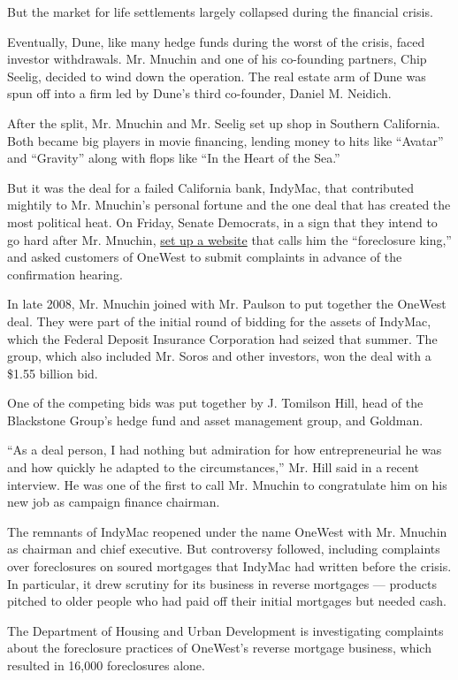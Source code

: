 But the market for life settlements largely collapsed during the
financial crisis.

Eventually, Dune, like many hedge funds during the worst of the crisis,
faced investor withdrawals. Mr. Mnuchin and one of his co-founding
partners, Chip Seelig, decided to wind down the operation. The real
estate arm of Dune was spun off into a firm led by Dune's third
co-founder, Daniel M. Neidich.

After the split, Mr. Mnuchin and Mr. Seelig set up shop in Southern
California. Both became big players in movie financing, lending money to
hits like ``Avatar'' and ``Gravity'' along with flops like ``In the
Heart of the Sea.''

But it was the deal for a failed California bank, IndyMac, that
contributed mightily to Mr. Mnuchin's personal fortune and the one deal
that has created the most political heat. On Friday, Senate Democrats,
in a sign that they intend to go hard after Mr. Mnuchin,
\href{https://democrats.senate.gov/foreclosureking/\#.WFfkiVMrLIX}{set
up a website} that calls him the ``foreclosure king,'' and asked
customers of OneWest to submit complaints in advance of the confirmation
hearing.

In late 2008, Mr. Mnuchin joined with Mr. Paulson to put together the
OneWest deal. They were part of the initial round of bidding for the
assets of IndyMac, which the Federal Deposit Insurance Corporation had
seized that summer. The group, which also included Mr. Soros and other
investors, won the deal with a \$1.55 billion bid.

One of the competing bids was put together by J. Tomilson Hill, head of
the Blackstone Group's hedge fund and asset management group, and
Goldman.

``As a deal person, I had nothing but admiration for how entrepreneurial
he was and how quickly he adapted to the circumstances,'' Mr. Hill said
in a recent interview. He was one of the first to call Mr. Mnuchin to
congratulate him on his new job as campaign finance chairman.

The remnants of IndyMac reopened under the name OneWest with Mr. Mnuchin
as chairman and chief executive. But controversy followed, including
complaints over foreclosures on soured mortgages that IndyMac had
written before the crisis. In particular, it drew scrutiny for its
business in reverse mortgages --- products pitched to older people who
had paid off their initial mortgages but needed cash.

The Department of Housing and Urban Development is investigating
complaints about the foreclosure practices of OneWest's reverse mortgage
business, which resulted in 16,000 foreclosures alone.

